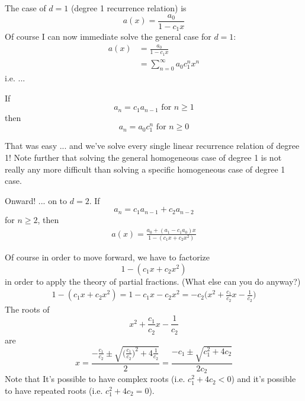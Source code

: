 The case of $d = 1$ (degree 1 recurrence relation) is
\[
a(x) = 
\frac
{a_0}
{1 - c_1x}
\]
Of course I can now immediate solve the general case for $d = 1$:
\begin{align*}
a(x) 
&= \frac{a_0}{1 - c_1x} \\
&= \sum_{n=0}^\infty a_0c_1^n x^n
\end{align*}
i.e. ...

\begin{thm}
If 
\[
a_n = c_1a_{n-1} \text{ for } n \geq 1
\]
then
\[
a_n = a_0 c_1^n \text{ for } n \geq 0
\]
\end{thm}





\newpage
That was easy ...
and we've solve every single linear recurrence relation of degree 1!
Note further that solving the general homogeneous case of degree 1 
is not really 
any more difficult
than solving a specific homogeneous case of degree 1 case.

Onward! ... on to $d = 2$. If
\[
a_n = c_1 a_{n-1} + c_2 a_{n-2}
\]
for $n \geq 2$, then
\begin{align*}
a(x) 
= 
\frac
{a_0 + (a_1 - c_1 a_0) x}
{1 - (c_1 x + c_2 x^2)}
\end{align*}

Of course in order to move forward, we have to factorize
\[
1 - (c_1 x + c_2 x^2)
\]
in order to apply the theory of partial fractions.
(What else can you do anyway?)
\begin{align*}
1 - (c_1 x + c_2 x^2)
= 1 - c_1 x - c_2 x^2
= -c_2 \biggl( x^2 + \frac{c_1}{c_2} x - \frac{1}{c_2} \biggr)
\end{align*}
The roots of
\[
x^2 + \frac{c_1}{c_2} x - \frac{1}{c_2}
\]
are
\[
x = 
\frac
{-\frac{c_1}{c_2} 
\pm 
\sqrt{
\bigl( \frac{c_1}{c_2} \bigr)^2
+ 4 \frac{1}{c_2}
}
}
{2}
=
\frac{-c_1 \pm \sqrt{c_1^2 + 4c_2}}{2c_2}
\]
Note that 
It's possible to have complex roots (i.e. $c_1^2 + 4c_2 < 0$)
and it's possible to have repeated roots (i.e. $c_1^2 + 4c_2 = 0$).

